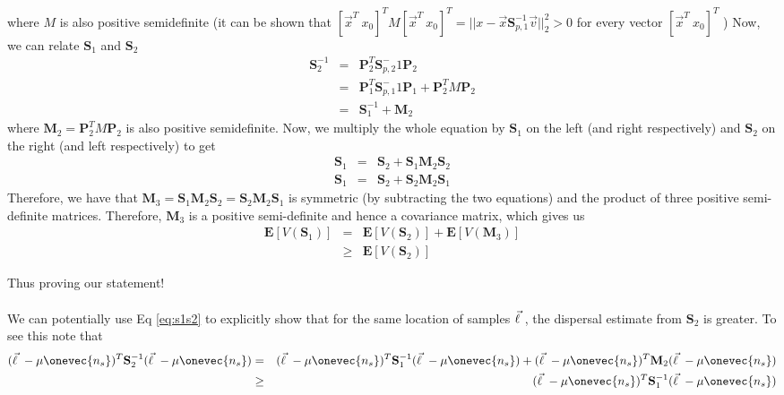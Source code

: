 where $M$ is also positive semidefinite (it can be shown that $[\vec{x}^T \ x_0 ]^TM [\vec{x}^T \ x_0]^T = ||x-\vec{x}\mathbf{S}_{p,1}^{-1}\vec{v}||_2^2>0$ for every vector $[\vec{x}^T \ x_0]^T$ )
Now, we can relate $\mathbf{S}_1$ and $\mathbf{S}_2$
\begin{eqnarray}
    \mathbf{S}_2^{-1} &=& \mathbf{P}_2^T \mathbf{S}_{p,2}^-1 \mathbf{P}_2 \\
    &=& \mathbf{P}_1^T\mathbf{S}_{p,1}^-1\mathbf{P}_1 + \mathbf{P}_2^TM\mathbf{P}_2 \\
    &=& \mathbf{S}_1^{-1} + \mathbf{M}_2 \label{eq:s1s2}
\end{eqnarray}
where $\mathbf{M}_2 = \mathbf{P}_2^TM\mathbf{P}_2$ is also positive semidefinite.
Now, we multiply the whole equation by $\mathbf{S}_1$ on the left (and right respectively) and $\mathbf{S}_2$ on the right (and left respectively) to get 
\begin{eqnarray}
    \mathbf{S}_1 &=& \mathbf{S}_2 + \mathbf{S}_1\mathbf{M}_2\mathbf{S}_2 \\ 
    \mathbf{S}_1 &=& \mathbf{S}_2 + \mathbf{S}_2\mathbf{M}_2\mathbf{S}_1
\end{eqnarray}
Therefore, we have that $\mathbf{M}_3=\mathbf{S}_1\mathbf{M}_2\mathbf{S}_2 = \mathbf{S}_2\mathbf{M}_2\mathbf{S}_1$ is symmetric (by subtracting the two equations) and the product of three positive semi-definite matrices. Therefore, $\mathbf{M}_3$ is a positive semi-definite and hence a covariance matrix, which gives us  
\begin{eqnarray}
    \mathbf{E}[V(\mathbf{S}_1)] &=& \mathbf{E}[V(\mathbf{S}_2)] + \mathbf{E}[V(\mathbf{M}_3)] \\ 
    &\geq&  \mathbf{E}[V(\mathbf{S}_2)]
\end{eqnarray}

Thus proving our statement! 
\\ \\
We can potentially use Eq \ref{eq:s1s2} to explicitly show that for the same location of samples $\vec{\ell} \ $, the dispersal estimate from $\mathbf{S}_2$ is greater. To see this note that 
\begin{eqnarray}
    (\lvec-\mu\onevec{{n_s}})^T \mathbf{S}_2^{-1} (\lvec-\mu\onevec{{n_s}}) &=& (\lvec-\mu\onevec{{n_s}})^T \mathbf{S}_1^{-1} (\lvec-\mu\onevec{{n_s}}) + (\lvec-\mu\onevec{{n_s}})^T \mathbf{M}_2 (\lvec-\mu\onevec{{n_s}}) \\
    &\geq& (\lvec-\mu\onevec{{n_s}})^T \mathbf{S}_1^{-1} (\lvec-\mu\onevec{{n_s}})
\end{eqnarray}

